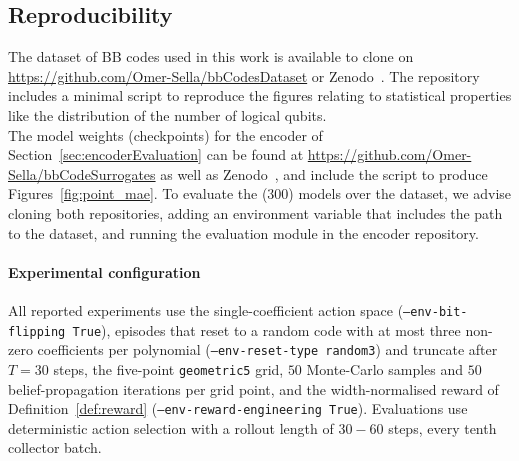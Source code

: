 \subsection{Reproducibility}
\noindent The dataset of BB codes used in this work is available to clone on \url{https://github.com/Omer-Sella/bbCodesDataset} or Zenodo~\cite{sella2026bbcodesdataset}. The repository includes a minimal script to reproduce the figures relating to statistical properties like the distribution of the number of logical qubits.\\
\noindent The model weights (checkpoints) for the encoder of Section~\ref{sec:encoderEvaluation} can be found at \url{https://github.com/Omer-Sella/bbCodeSurrogates} as well as 
Zenodo~\cite{sella2026bbcodesurrogates}, 
and include the script to produce Figures~\ref{fig:point_mae}. To evaluate the (\(300\)) models over the dataset, we advise cloning both repositories, adding an environment variable that includes the path to the dataset, and running the evaluation module in the encoder repository.
\paragraph{Experimental configuration}
All reported experiments use the single-coefficient action space
(\texttt{--env-bit-flipping True}), episodes that reset to a random code with
at most three non-zero coefficients per polynomial
(\texttt{--env-reset-type random3}) and truncate after \(T=30\) steps, the
five-point \texttt{geometric5} grid, \(50\) Monte-Carlo samples and \(50\)
belief-propagation iterations per grid point, and the width-normalised reward
of Definition~\ref{def:reward} (\texttt{--env-reward-engineering True}).
Evaluations use deterministic action selection with a rollout length of \(30-60\)
steps, every tenth collector batch. 

